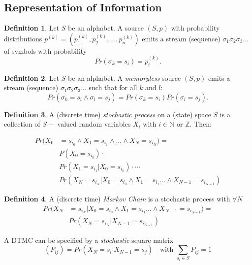 \documentclass[a4paper]{article}
\theoremstyle{definition} \newtheorem*{definition}{Definition}
\newcommand{\naturals}{\mathbb{N}}
\newcommand{\integers}{\mathbb{Z}}
\begin{document}
\subsection{Representation of Information}
\begin{definition}
  Let $S$ be an alphabet. A source $(S,p)$ with probability distributions
  $p^{(k)} = \left( p_1^{(k)}, p_2^{(k)}, \dots , p_n^{(k)} \right)$ emits
  a stream (sequence) $\sigma_1\sigma_2\sigma_3 \dots$ of symbols with
  probability
  \[
    Pr(\sigma_k = s_i) = p_i^{(k)}.
  \]
\end{definition}
\begin{definition}
  Let $S$ be an alphabet. A \emph{memoryless} source $(S,p)$ emits
  a stream (sequence) $\sigma_1\sigma_2\sigma_3 \dots$ 
  such that for all $k$ and $l$:
  \[
    Pr(\sigma_k = s_i \land \sigma_l = s_j) = Pr(\sigma_k =
    s_i)Pr(\sigma_l = s_j).
  \]
\end{definition}

\begin{definition}
  A (discrete time) \emph{stochastic process} on a (state) space $S$ is
  a collection of $S-$ valued random variables $X_i$ with $i \in
  \naturals$ or $\integers$. Then:

  \begin{align*}
    Pr(X_0 &= s_{i_0} \land X_1 = s_{i_1} \land \dots 
    \land X_N = s_{i_N}) = \\
    &P(X_0 = s_{i_0}) \cdot \\
     &Pr( X_1 = s_{i_1} | X_0 = s_{i_0}) \cdot \cdots \\
     &Pr(X_N = s_{i_N} | X_0 = s_{i_0} \land X_1 = s_{i_1} \dots \land
    X_{N-1} = s_{i_{N-1}})
  \end{align*}
\end{definition}

\begin{definition}
  A (discrete time) \emph{Markov Chain} is a stochastic process with
  $\forall N$
  \begin{align*}
    Pr(X_N &= s_{i_N} | X_0 = s_{i_0} \land X_1 = s_{i_1} \dots \land
        X_{N-1} = s_{i_{N-1}}) = \\
        &Pr(X_N = s_{i_N} | X_{N-1} = s_{i_{N-1}})
  \end{align*}

  A DTMC can be specified by a \emph{stochastic} square matrix
  \[
    \boxed{(P_{ij}) = Pr(X_N = s_i | X_{N-1} = s_j)} \quad \text{with } 
    \sum_{s_i \in S} P_{ij} = 1
  \]
\end{definition}
\end{document}
